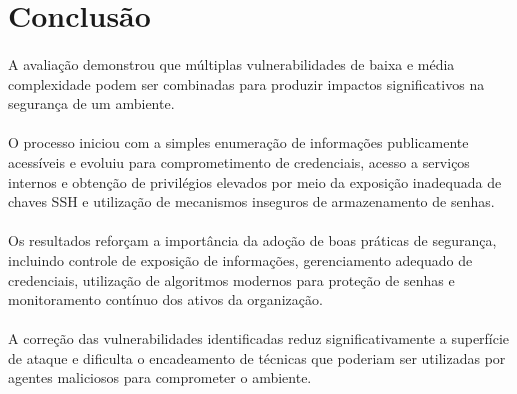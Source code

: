 \section{Conclusão}

\paragraph{}
A avaliação demonstrou que múltiplas vulnerabilidades de baixa e média
complexidade podem ser combinadas para produzir impactos significativos na
segurança de um ambiente.

\paragraph{}
O processo iniciou com a simples enumeração de informações publicamente
acessíveis e evoluiu para comprometimento de credenciais, acesso a serviços
internos e obtenção de privilégios elevados por meio da exposição inadequada de
chaves SSH e utilização de mecanismos inseguros de armazenamento de senhas.

\paragraph{}
Os resultados reforçam a importância da adoção de boas práticas de segurança,
incluindo controle de exposição de informações, gerenciamento adequado de
credenciais, utilização de algoritmos modernos para proteção de senhas e
monitoramento contínuo dos ativos da organização.

\paragraph{}
A correção das vulnerabilidades identificadas reduz significativamente a
superfície de ataque e dificulta o encadeamento de técnicas que poderiam ser
utilizadas por agentes maliciosos para comprometer o ambiente.
